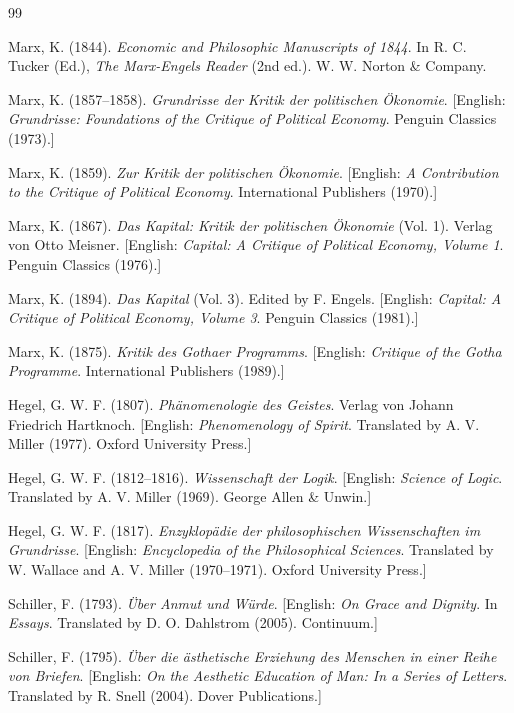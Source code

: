 \documentclass[11pt,a4paper]{article}
\theoremstyle{definition}
\theoremstyle{remark}
\begin{document}
\begin{thebibliography}{99}

Marx, K. (1844). \textit{Economic and Philosophic Manuscripts of 1844}. In R. C. Tucker (Ed.), \textit{The Marx-Engels Reader} (2nd ed.). W. W. Norton \& Company.

Marx, K. (1857--1858). \textit{Grundrisse der Kritik der politischen \"Okonomie}. [English: \textit{Grundrisse: Foundations of the Critique of Political Economy}. Penguin Classics (1973).]

Marx, K. (1859). \textit{Zur Kritik der politischen \"Okonomie}. [English: \textit{A Contribution to the Critique of Political Economy}. International Publishers (1970).]

Marx, K. (1867). \textit{Das Kapital: Kritik der politischen \"Okonomie} (Vol. 1). Verlag von Otto Meisner. [English: \textit{Capital: A Critique of Political Economy, Volume 1}. Penguin Classics (1976).]

Marx, K. (1894). \textit{Das Kapital} (Vol. 3). Edited by F. Engels. [English: \textit{Capital: A Critique of Political Economy, Volume 3}. Penguin Classics (1981).]

Marx, K. (1875). \textit{Kritik des Gothaer Programms}. [English: \textit{Critique of the Gotha Programme}. International Publishers (1989).]

Hegel, G. W. F. (1807). \textit{Ph\"anomenologie des Geistes}. Verlag von Johann Friedrich Hartknoch. [English: \textit{Phenomenology of Spirit}. Translated by A. V. Miller (1977). Oxford University Press.]

Hegel, G. W. F. (1812--1816). \textit{Wissenschaft der Logik}. [English: \textit{Science of Logic}. Translated by A. V. Miller (1969). George Allen \& Unwin.]

Hegel, G. W. F. (1817). \textit{Enzyklop\"adie der philosophischen Wissenschaften im Grundrisse}. [English: \textit{Encyclopedia of the Philosophical Sciences}. Translated by W. Wallace and A. V. Miller (1970--1971). Oxford University Press.]

Schiller, F. (1793). \textit{\"Uber Anmut und W\"urde}. [English: \textit{On Grace and Dignity}. In \textit{Essays}. Translated by D. O. Dahlstrom (2005). Continuum.]

Schiller, F. (1795). \textit{\"Uber die \"asthetische Erziehung des Menschen in einer Reihe von Briefen}. [English: \textit{On the Aesthetic Education of Man: In a Series of Letters}. Translated by R. Snell (2004). Dover Publications.]


\end{thebibliography}
\end{document}
